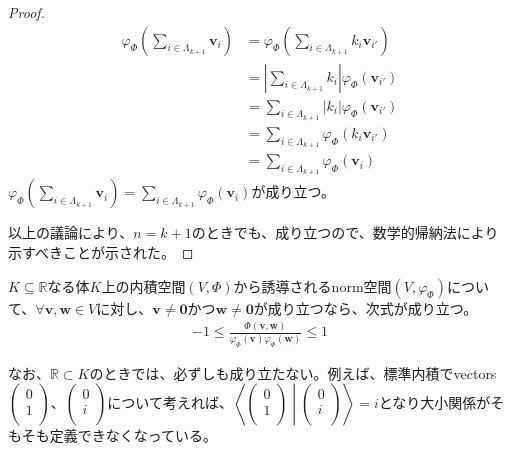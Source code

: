 \documentclass[dvipdfmx]{jsarticle}
\begin{document}
\begin{proof}
\begin{align*}
\varphi_{\varPhi}\left( \sum_{i \in \varLambda_{k + 1}} \mathbf{v}_{i} \right) &= \varphi_{\varPhi}\left( \sum_{i \in \varLambda_{k + 1}} {k_{i}\mathbf{v}_{i'}} \right)\\
&= \left| \sum_{i \in \varLambda_{k + 1}} k_{i} \right|\varphi_{\varPhi}\left( \mathbf{v}_{i'} \right)\\
&= \sum_{i \in \varLambda_{k + 1}} {\left| k_{i} \right|\varphi_{\varPhi}\left( \mathbf{v}_{i'} \right)}\\
&= \sum_{i \in \varLambda_{k + 1}} {\varphi_{\varPhi}\left( k_{i}\mathbf{v}_{i'} \right)}\\
&= \sum_{i \in \varLambda_{k + 1}} {\varphi_{\varPhi}\left( \mathbf{v}_{i} \right)}
\end{align*}
$\varphi_{\varPhi}\left( \sum_{i \in \varLambda_{k + 1}} \mathbf{v}_{i} \right) = \sum_{i \in \varLambda_{k + 1}} {\varphi_{\varPhi}\left( \mathbf{v}_{i} \right)}$が成り立つ。\par
以上の議論により、$n = k + 1$のときでも、成り立つので、数学的帰納法により示すべきことが示された。
\end{proof}
\begin{thm}\label{2.3.6.9}
$K \subseteq \mathbb{R}$なる体$K$上の内積空間$(V,\varPhi)$から誘導されるnorm空間$\left( V,\varphi_{\varPhi} \right)$について、$\forall\mathbf{v},\mathbf{w} \in V$に対し、$\mathbf{v} \neq \mathbf{0}$かつ$\mathbf{w} \neq \mathbf{0}$が成り立つなら、次式が成り立つ。
\begin{align*}
- 1 \leq \frac{\varPhi\left( \mathbf{v},\mathbf{w} \right)}{\varphi_{\varPhi}\left( \mathbf{v} \right)\varphi_{\varPhi}\left( \mathbf{w} \right)} \leq 1
\end{align*}
\end{thm}\par
なお、$\mathbb{R} \subset K$のときでは、必ずしも成り立たない。例えば、標準内積でvectors$\begin{pmatrix}
0 \\
1 \\
\end{pmatrix}$、$\begin{pmatrix}
0 \\
i \\
\end{pmatrix}$について考えれば、$\left\langle \begin{pmatrix}
0 \\
1 \\
\end{pmatrix} \middle| \begin{pmatrix}
0 \\
i \\
\end{pmatrix} \right\rangle = i$となり大小関係がそもそも定義できなくなっている。
\end{document}
